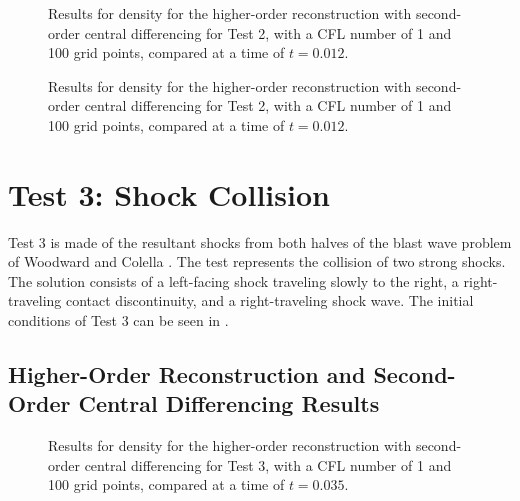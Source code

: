 \begin{figure}
	\caption[Results for density for the higher-order reconstruction with second-order central differencing for Test 2, with a CFL number of 1 and 100 grid points, compared at a time of $t=0.012$.]{Results for density for the higher-order reconstruction with second-order central differencing for Test 2, with a CFL number of 1 and 100 grid points, compared at a time of $t=0.012$.}
	\label{fig:Test3HORCD2pressure}
\end{figure}

\begin{figure}
	\caption[Results for density for the higher-order reconstruction with second-order central differencing for Test 2, with a CFL number of 1 and 100 grid points, compared at a time of $t=0.012$.]{Results for density for the higher-order reconstruction with second-order central differencing for Test 2, with a CFL number of 1 and 100 grid points, compared at a time of $t=0.012$.}
	\label{fig:Test3HORCD2energy}
\end{figure}

\section{Test 3: Shock Collision}
Test 3 is made of the resultant shocks from both halves of the blast wave problem of Woodward and Colella \cite{WOODWARD1984115}. The test represents the collision of two strong shocks. The solution consists of a left-facing shock traveling slowly to the right, a right-traveling contact discontinuity, and a right-traveling shock wave. The initial conditions of Test 3 can be seen in .

\subsection{Higher-Order Reconstruction and Second-Order Central Differencing Results}
\begin{figure}
	\caption[Results for density for the higher-order reconstruction with second-order central differencing for Test 3, with a CFL number of 1 and 100 grid points, compared at a time of $t=0.035$.]{Results for density for the higher-order reconstruction with second-order central differencing for Test 3, with a CFL number of 1 and 100 grid points, compared at a time of $t=0.035$.}
	\label{fig:Test4HORCD2density}
\end{figure}


